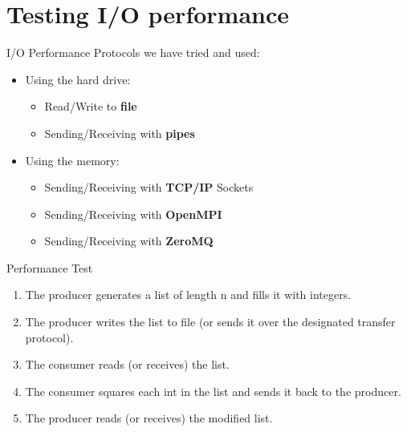 \documentclass{beamer}
\begin{document}
    \section{Testing I/O performance}

    \begin{frame}{I/O Performance}
    Protocols we have tried and used:
    \pause
    \begin{itemize}[<+-|alert@+>]
        \item Using the hard drive:
            \begin{itemize}
                \item Read/Write to \textbf{file}
                \item Sending/Receiving with \textbf{pipes}
            \end{itemize}
        \item Using the memory:
            \begin{itemize}[<+-|alert@+>]
                \item Sending/Receiving with \textbf{TCP/IP} Sockets
                \item Sending/Receiving with \textbf{OpenMPI}
                \item Sending/Receiving with \textbf{ZeroMQ}
            \end{itemize}
    \end{itemize}
    \end{frame}
    \begin{frame}{Performance Test}
        \begin{enumerate}[<+-|alert@+>]
            \item The producer generates a list of length n and fills it with
                  integers.
            \item The producer writes the list to file (or sends it over the
                  designated transfer protocol).
            \item The consumer reads (or receives) the list.
            \item The consumer squares each int in the list and sends it back
                  to the producer.
            \item The producer reads (or receives) the modified list.
        \end{enumerate}
    \end{frame}
\end{document}
